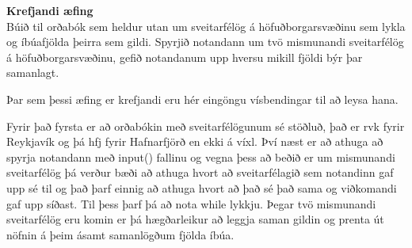 \begin{exercise}\label{dic7}
\textbf{Krefjandi æfing}\\
Búið til orðabók sem heldur utan um sveitarfélög á höfuðborgarsvæðinu sem lykla og íbúafjölda þeirra sem gildi.
Spyrjið notandann um tvö mismunandi sveitarfélög á höfuðborgarsvæðinu, gefið notandanum upp hversu mikill fjöldi býr þar samanlagt.
\end{exercise}
\begin{Answer}[ref={dic7}]
Þar sem þessi æfing er krefjandi eru hér eingöngu vísbendingar til að leysa hana.

Fyrir það fyrsta er að orðabókin með sveitarfélögunum sé stöðluð, það er rvk fyrir Reykjavík og þá hfj fyrir Hafnarfjörð en ekki á víxl.
Því næst er að athuga að spyrja notandann með input() fallinu og vegna þess að beðið er um mismunandi sveitarfélög þá verður bæði að athuga hvort að sveitarfélagið sem notandinn gaf upp sé til og það þarf einnig að athuga hvort að það sé það sama og viðkomandi gaf upp síðast.
Til þess þarf þá að nota while lykkju.
Þegar tvö mismunandi sveitarfélög eru komin er þá hægðarleikur að leggja saman gildin og prenta út nöfnin á þeim ásamt samanlögðum fjölda íbúa.
\end{Answer}


